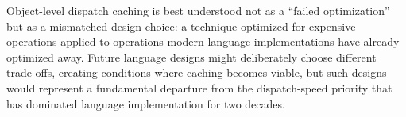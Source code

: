 \documentclass[sigplan,final,acmsmall,review,screen]{acmart}
\begin{document}
Object-level dispatch caching is best understood not as a ``failed optimization'' but as a mismatched design choice:
a technique optimized for expensive operations applied to operations modern language implementations have already optimized away.
Future language designs might deliberately choose different trade-offs, creating conditions where caching becomes viable,
but such designs would represent a fundamental departure from the dispatch-speed priority that has dominated language implementation for two decades.



\end{document}
